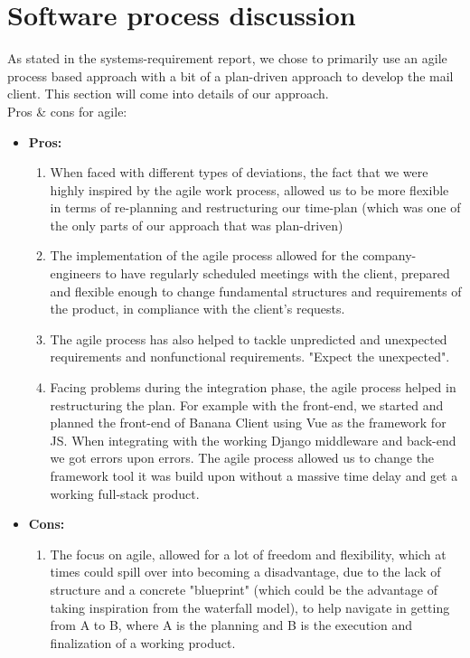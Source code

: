 \documentclass{article}
\begin{document}
\section*{Software process discussion}
As stated in the systems-requirement report, we chose to primarily use an agile process based approach with a bit of a plan-driven approach to develop the mail client. This section will come into details of our approach. \\
Pros \& cons for agile:
\begin{itemize}
    \item \textbf{Pros: } 
    \begin{enumerate}
         \item When faced with different types of deviations, the fact that we were highly inspired by the agile work process, allowed us to be more flexible in terms of re-planning and restructuring our time-plan (which was one of the only parts of our approach that was plan-driven)
        \item The implementation of the agile process allowed for the company-engineers to have regularly scheduled meetings with the client, prepared and flexible enough to change fundamental structures and requirements of the product, in compliance with the client's requests.
        \item The agile process has also helped to tackle unpredicted and unexpected requirements and nonfunctional requirements. "Expect the unexpected". 
        \item Facing problems during the integration phase, the agile process helped in restructuring the plan. For example with the front-end, we started and planned the front-end of Banana Client using Vue as the framework for JS. When integrating with the working Django middleware and back-end we got errors upon errors. The agile process allowed us to change the framework tool it was build upon without a massive time delay and get a working full-stack product.   
    \end{enumerate}
    \item \textbf{Cons: } 
    \begin{enumerate}
        \item The focus on agile, allowed for a lot of freedom and flexibility, which at times could spill over into becoming a disadvantage, due to the lack of structure and a concrete "blueprint" (which could be the advantage of taking inspiration from the waterfall model), to help navigate in getting from A to B, where A is the planning and B is the execution and finalization of a working product.
    \end{enumerate}
\end{itemize}
\end{document}
